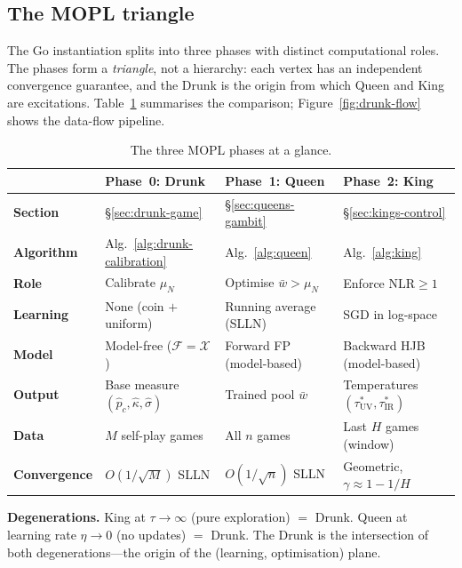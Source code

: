 \documentclass[11pt,a4paper]{article}
\newcommand{\cF}{\mathcal{F}}
\newcommand{\cX}{\mathcal{X}}
\begin{document}
\subsection{The MOPL triangle}\label{sec:mopl-triangle}

The Go instantiation splits into three phases with distinct
computational roles.
The phases form a \emph{triangle}, not a hierarchy:
each vertex has an independent convergence guarantee,
and the Drunk is the origin from which Queen and King
are excitations.
Table~\ref{tab:mopl-triangle} summarises the comparison;
Figure~\ref{fig:drunk-flow} shows the data-flow pipeline.

\begin{table}[ht]
\centering
\small
\caption{The three MOPL phases at a glance.}\label{tab:mopl-triangle}
\begin{tabular}{@{}l l l l@{}}
\toprule
& \textbf{Phase~0: Drunk}
& \textbf{Phase~1: Queen}
& \textbf{Phase~2: King} \\
\midrule
\textbf{Section}
  & \S\ref{sec:drunk-game}
  & \S\ref{sec:queens-gambit}
  & \S\ref{sec:kings-control} \\
\textbf{Algorithm}
  & Alg.~\ref{alg:drunk-calibration}
  & Alg.~\ref{alg:queen}
  & Alg.~\ref{alg:king} \\
\textbf{Role}
  & Calibrate $\mu_N$
  & Optimise $\bar{w} > \mu_N$
  & Enforce $\mathrm{NLR} \geq 1$ \\
\textbf{Learning}
  & None (coin $+$ uniform)
  & Running average (SLLN)
  & SGD in log-space \\
\textbf{Model}
  & Model-free ($\cF = \cX$)
  & Forward FP (model-based)
  & Backward HJB (model-based) \\
\textbf{Output}
  & Base measure $(\hat{p}_c, \hat{\kappa}, \hat{\sigma})$
  & Trained pool $\bar{w}$
  & Temperatures $(\tau^*_{\mathrm{UV}}, \tau^*_{\mathrm{IR}})$ \\
\textbf{Data}
  & $M$ self-play games
  & All $n$ games
  & Last $H$ games (window) \\
\textbf{Convergence}
  & $O(1/\!\sqrt{M})$ SLLN
  & $O(1/\!\sqrt{n})$ SLLN
  & Geometric, $\gamma \approx 1 - 1/H$ \\
\bottomrule
\end{tabular}
\end{table}

\medskip\noindent
\textbf{Degenerations.}\;
King at $\tau \to \infty$ (pure exploration) $=$ Drunk.
Queen at learning rate $\eta \to 0$ (no updates) $=$ Drunk.
The Drunk is the intersection of both degenerations---the
origin of the (learning, optimisation) plane.
\end{document}
